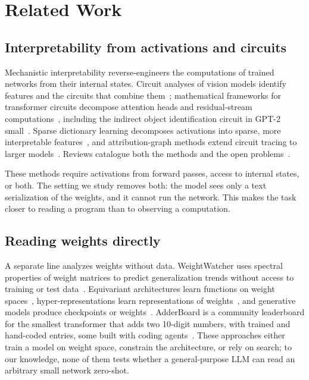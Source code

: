 \documentclass[11pt]{article}
\begin{document}
\section{Related Work}

\subsection{Interpretability from activations and circuits}

Mechanistic interpretability reverse-engineers the computations of trained networks from their internal states. Circuit analyses of vision models identify features and the circuits that combine them~\cite{olah}; mathematical frameworks for transformer circuits decompose attention heads and residual-stream computations~\cite{elhage}, including the indirect object identification circuit in GPT-2 small~\cite{wangR}. Sparse dictionary learning decomposes activations into sparse, more interpretable features~\cite{bricken,cunningham}, and attribution-graph methods extend circuit tracing to larger models~\cite{ameisen}. Reviews catalogue both the methods and the open problems~\cite{bereska,sharkey}.

These methods require activations from forward passes, access to internal states, or both. The setting we study removes both: the model sees only a text serialization of the weights, and it cannot run the network. This makes the task closer to reading a program than to observing a computation.

\subsection{Reading weights directly}

A separate line analyzes weights without data. WeightWatcher uses spectral properties of weight matrices to predict generalization trends without access to training or test data~\cite{martin}. Equivariant architectures learn functions on weight spaces~\cite{navon}, hyper-representations learn representations of weights~\cite{schurholt}, and generative models produce checkpoints or weights~\cite{peebles,wangJ,wangK}. AdderBoard is a community leaderboard for the smallest transformer that adds two 10-digit numbers, with trained and hand-coded entries, some built with coding agents~\cite{papailiopoulos}. These approaches either train a model on weight space, constrain the architecture, or rely on search; to our knowledge, none of them tests whether a general-purpose LLM can read an arbitrary small network zero-shot.
\end{document}
